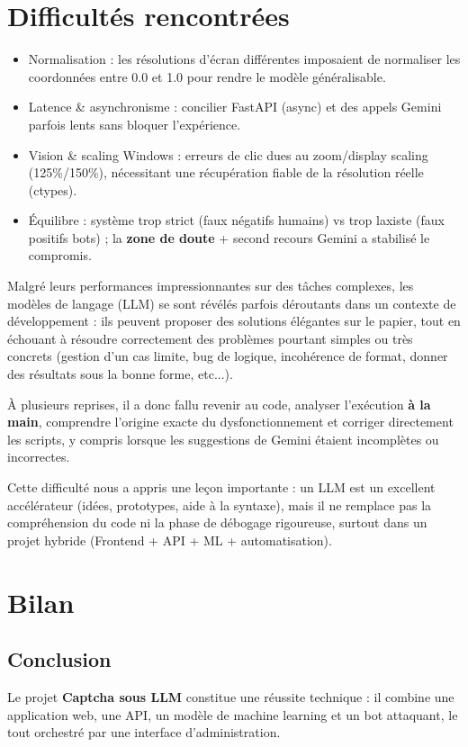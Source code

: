 \documentclass[a4paper, 12pt, twoside]{article}
\begin{document}
\section{Difficultés rencontrées}
\begin{itemize}
    \item Normalisation : les résolutions d'écran différentes imposaient de normaliser les coordonnées entre 0.0 et 1.0 pour rendre le modèle généralisable.
    \item Latence \& asynchronisme : concilier FastAPI (async) et des appels Gemini parfois lents sans bloquer l'expérience.
    \item Vision \& scaling Windows : erreurs de clic dues au zoom/display scaling (125\%/150\%), nécessitant une récupération fiable de la résolution réelle (ctypes).
    \item Équilibre : système trop strict (faux négatifs humains) vs trop laxiste (faux positifs bots) ; la \textbf{zone de doute} + second recours Gemini a stabilisé le compromis.
\end{itemize}

Malgré leurs performances impressionnantes sur des tâches complexes, les modèles de langage (LLM) se sont révélés parfois déroutants dans un contexte de développement : ils peuvent proposer des solutions élégantes sur le papier, tout en échouant à résoudre correctement des problèmes pourtant simples ou très concrets (gestion d'un cas limite, bug de logique, incohérence de format, donner des résultats sous la bonne forme, etc...).

À plusieurs reprises, il a donc fallu revenir au code, analyser l'exécution \textbf{à la main}, comprendre l'origine exacte du dysfonctionnement et corriger directement les scripts, y compris lorsque les suggestions de Gemini étaient incomplètes ou incorrectes.

Cette difficulté nous a appris une leçon importante : un LLM est un excellent accélérateur (idées, prototypes, aide à la syntaxe), mais il ne remplace pas la compréhension du code ni la phase de débogage rigoureuse, surtout dans un projet hybride (Frontend + API + ML + automatisation).

\section{Bilan}

\subsection{Conclusion}
Le projet \textbf{Captcha sous LLM} constitue une réussite technique : il combine une application web, une API, un modèle de machine learning et un bot attaquant, le tout orchestré par une interface d'administration.
\end{document}

